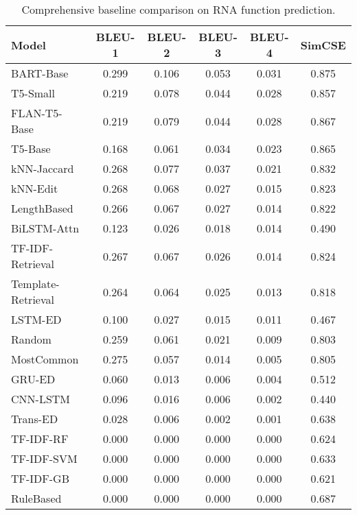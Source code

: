 \begin{table}[h]
\centering
\begin{tabular}{lccccc}
\toprule
Model & BLEU-1 & BLEU-2 & BLEU-3 & BLEU-4 & SimCSE \\
\midrule
BART-Base & 0.299 & 0.106 & 0.053 & 0.031 & 0.875 \\
T5-Small & 0.219 & 0.078 & 0.044 & 0.028 & 0.857 \\
FLAN-T5-Base & 0.219 & 0.079 & 0.044 & 0.028 & 0.867 \\
T5-Base & 0.168 & 0.061 & 0.034 & 0.023 & 0.865 \\
kNN-Jaccard & 0.268 & 0.077 & 0.037 & 0.021 & 0.832 \\
kNN-Edit & 0.268 & 0.068 & 0.027 & 0.015 & 0.823 \\
LengthBased & 0.266 & 0.067 & 0.027 & 0.014 & 0.822 \\
BiLSTM-Attn & 0.123 & 0.026 & 0.018 & 0.014 & 0.490 \\
TF-IDF-Retrieval & 0.267 & 0.067 & 0.026 & 0.014 & 0.824 \\
Template-Retrieval & 0.264 & 0.064 & 0.025 & 0.013 & 0.818 \\
LSTM-ED & 0.100 & 0.027 & 0.015 & 0.011 & 0.467 \\
Random & 0.259 & 0.061 & 0.021 & 0.009 & 0.803 \\
MostCommon & 0.275 & 0.057 & 0.014 & 0.005 & 0.805 \\
GRU-ED & 0.060 & 0.013 & 0.006 & 0.004 & 0.512 \\
CNN-LSTM & 0.096 & 0.016 & 0.006 & 0.002 & 0.440 \\
Trans-ED & 0.028 & 0.006 & 0.002 & 0.001 & 0.638 \\
TF-IDF-RF & 0.000 & 0.000 & 0.000 & 0.000 & 0.624 \\
TF-IDF-SVM & 0.000 & 0.000 & 0.000 & 0.000 & 0.633 \\
TF-IDF-GB & 0.000 & 0.000 & 0.000 & 0.000 & 0.621 \\
RuleBased & 0.000 & 0.000 & 0.000 & 0.000 & 0.687 \\
\bottomrule
\end{tabular}
\caption{Comprehensive baseline comparison on RNA function prediction.}
\label{tab:baselines}
\end{table}